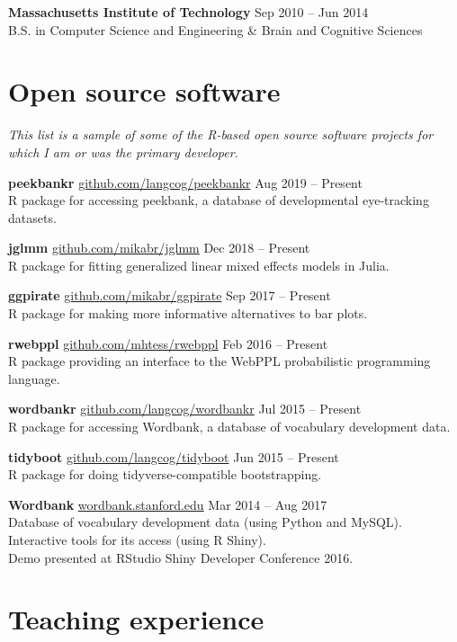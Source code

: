 \documentclass[11pt,]{article}
\newcommand{\project}[4]{
  \textbf{#1} \hspace{4pt} \small \href{http://#2}{#2} \normalsize \hfill #3\\ \hangindent=15pt #4
}
\begin{document}
\textbf{Massachusetts Institute of Technology} \hfill Sep 2010 -- Jun
2014\\
\hspace*{0.333em}\hspace*{0.333em}\hspace*{0.333em}\hspace*{0.333em}B.S.
in Computer Science and Engineering \& Brain and Cognitive Sciences

\hypertarget{open-source-software}{%
\section{\texorpdfstring{\scalebox{1.3}{\faCodeFork} \hspace{1.5pt} Open
source software}{  Open source software}}\label{open-source-software}}

\emph{This list is a sample of some of the R-based open source software
projects for which I am or was the primary developer.}

\project{peekbankr}{github.com/langcog/peekbankr}{Aug 2019 -- Present}{R package for accessing peekbank, a database of developmental eye-tracking datasets.}

\project{jglmm}{github.com/mikabr/jglmm}{Dec 2018 -- Present}{R package for fitting generalized linear mixed effects models in Julia.}

\project{ggpirate}{github.com/mikabr/ggpirate}{Sep 2017 -- Present}{R package for making more informative alternatives to bar plots.}

\project{rwebppl}{github.com/mhtess/rwebppl}{Feb 2016 -- Present}{R package providing an interface to the WebPPL probabilistic programming language.}

\project{wordbankr}{github.com/langcog/wordbankr}{Jul 2015 -- Present}{R package for accessing Wordbank, a database of vocabulary development data.}

\project{tidyboot}{github.com/langcog/tidyboot}{Jun 2015 -- Present}{R package for doing tidyverse-compatible bootstrapping.}

\project{Wordbank}{wordbank.stanford.edu}{Mar 2014 -- Aug 2017}{Database of vocabulary development data (using Python and MySQL).\\ Interactive tools for its access (using R Shiny).\\ Demo presented at RStudio Shiny Developer Conference 2016.}

\hypertarget{teaching-experience}{%
\section{\texorpdfstring{\faUsers \hspace{2pt} Teaching
experience}{ Teaching experience}}\label{teaching-experience}}
\end{document}
